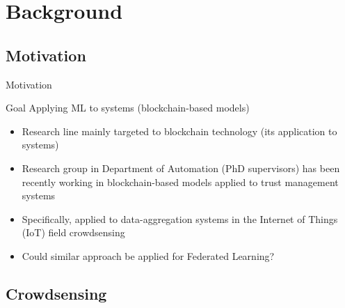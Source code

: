 

\section{Background}

\subsection{Motivation}

\begin{frame}{Motivation}
	\begin{block}{Goal}
        Applying ML to systems (blockchain-based models)
      \end{block}
  \begin{itemize}
    \item Research line mainly targeted to \alert{blockchain technology} (its application to systems)
    \item Research group in Department of Automation (PhD supervisors) has been recently working in blockchain-based models applied to \alert{trust management systems}
	\item Specifically, applied to data-aggregation systems in the Internet of Things (IoT) field \alert{crowdsensing}
	\item Could similar approach be applied for \alert{Federated Learning}?
  \end{itemize}
\end{frame}

\subsection{Crowdsensing}

